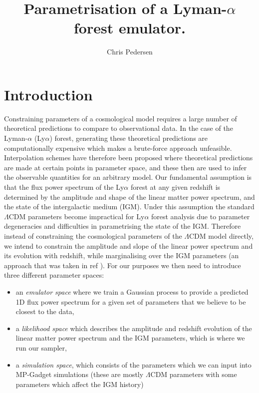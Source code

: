\documentclass[]{article}
\title{Parametrisation of a Lyman-$\alpha$ forest emulator.}
\author[a]{Chris Pedersen}
\affiliation[a]{Department of Physics and Astronomy, University College London, Gower Street, London, United Kingdom}
\newcommand{\lyaf}{Ly$\alpha$ forest }                     %
\newcommand{\lya}{Ly$\alpha$}
\begin{document}
\maketitle

\section{Introduction}
Constraining parameters of a cosmological model requires a large number of theoretical 
predictions to compare to observational data. In the case of the Lyman-$\alpha$ (\lya) 
forest, generating these theoretical predictions are computationally expensive which makes a 
brute-force approach unfeasible. Interpolation schemes have therefore been proposed where 
theoretical predictions are made at certain points in parameter space, and these then are 
used to infer the observable quantities for an arbitrary model.
Our fundamental assumption is that the flux power spectrum of the \lyaf at any given 
redshift is determined by the amplitude and shape of the linear matter power spectrum, 
and the state of the intergalactic medium (IGM). Under this assumption the standard 
$\Lambda$CDM parameters become impractical for \lyaf analysis due to parameter 
degeneracies and difficulties in parametrising the state of the IGM. Therefore instead of 
constraining the cosmological parameters of the $\Lambda$CDM model directly, we intend to 
constrain the amplitude and slope of the linear power spectrum and its evolution with 
redshift, while marginalising over the IGM parameters (an approach that was taken in ref 
\cite{McDonald2005}). For our purposes we then need to introduce three different 
parameter spaces:


\begin{itemize}
    \item an \textit{emulator space} where we train a Gaussian process to provide a 
    predicted 1D flux power spectrum for a given set of parameters that we believe to be 
    closest to the data,
    \item a \textit{likelihood space} which describes the amplitude and redshift 
    evolution of the linear matter power spectrum and the IGM parameters, which is where 
    we run our sampler,
    \item a \textit{simulation space}, which consists of the parameters which we can 
    input into MP-Gadget simulations (these are mostly $\Lambda$CDM parameters with some 
    parameters which affect the IGM history)
\end{itemize}
\end{document}
